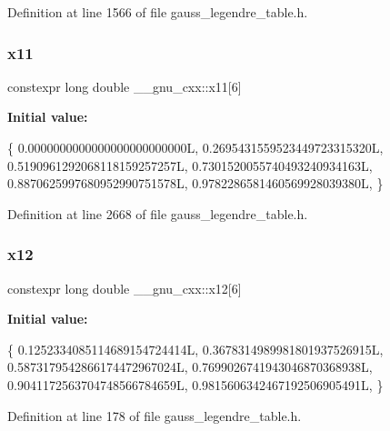 Definition at line 1566 of file gauss\+\_\+legendre\+\_\+table.\+h.

\mbox{\label{namespace____gnu__cxx_a44889c3e3daa2ff106fc46605e473274}} 
\subsubsection{\texorpdfstring{x11}{x11}}
{\footnotesize\ttfamily constexpr long double \+\_\+\+\_\+gnu\+\_\+cxx\+::x11\mbox{[}6\mbox{]}}

{\bfseries Initial value\+:}
\begin{DoxyCode}
\{
    0.0000000000000000000000000L,
    0.2695431559523449723315320L,
    0.5190961292068118159257257L,
    0.7301520055740493240934163L,
    0.8870625997680952990751578L,
    0.9782286581460569928039380L,
  \}
\end{DoxyCode}


Definition at line 2668 of file gauss\+\_\+legendre\+\_\+table.\+h.

\mbox{\label{namespace____gnu__cxx_a4ddd5b95128414a528dcb27b9f282596}} 
\subsubsection{\texorpdfstring{x12}{x12}}
{\footnotesize\ttfamily constexpr long double \+\_\+\+\_\+gnu\+\_\+cxx\+::x12\mbox{[}6\mbox{]}}

{\bfseries Initial value\+:}
\begin{DoxyCode}
\{
    0.1252334085114689154724414L,
    0.3678314989981801937526915L,
    0.5873179542866174472967024L,
    0.7699026741943046870368938L,
    0.9041172563704748566784659L,
    0.9815606342467192506905491L,
  \}
\end{DoxyCode}


Definition at line 178 of file gauss\+\_\+legendre\+\_\+table.\+h.

\mbox{\label{namespace____gnu__cxx_addcb20ac8e8359cd8fe6d15138b92fe9}} 

